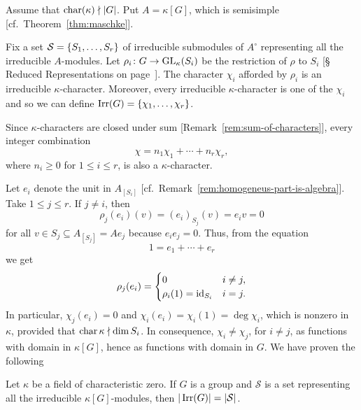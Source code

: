 \begin{rem}\label{rem:chi_j(e_i)}
    Assume that $\operatorname{char}(\kappa)\nmid|G|$. Put $A=\kappa[G]$, which is semisimple [cf.~Theorem~\ref{thm:maschke}]. 

    Fix a set $\mathcal S=\{S_1,\dots,S_r\}$ of irreducible submodules of $A^\circ$ representing all the irreducible $A$-modules. Let $\rho_i\colon G\to{\rm GL}_\kappa(S_i)$ be the restriction of $\rho$ to $S_i$ [\S\,Reduced Representations on page~\pageref{page:reudced-representations}]. The character $\chi_i$ afforded by $\rho_i$ is an irreducible $\kappa$-character. Moreover, every irreducible $\kappa$-character is one of the $\chi_i$ and so we can define $\operatorname{Irr}(G)=\{\chi_1,\dots,\chi_r\}$.
    
    Since $\kappa$-characters are closed under sum [Remark~\ref{rem:sum-of-characters}], every integer combination
    \begin{equation}\label{eq:integer-combination-of-characters}
        \chi = n_1\chi_1+\cdots+n_r\chi_r,
    \end{equation}
    where $n_i\ge0$ for $1\le i\le r$, is also a $\kappa$-character.
    
    Let $e_i$ denote the unit in $A_{[S_i]}$ [cf.~Remark~\ref{rem:homogeneus-part-is-algebra}]. Take $1\le j\le r$. If $j\ne i$, then
    \begin{equation}\label{eq:chi_j(e_i)}
        \rho_j(e_i)(v)=(e_i)_{S_j}(v)=e_iv=0
    \end{equation}
    for all $v\in S_j\subseteq A_{[S_j]}=Ae_j$ because $e_ie_j=0$. Thus, from the equation
    $$
        1 = e_1+\cdots+e_r
    $$
    we get
    $$
        \rho_j(e_i) = \begin{cases}
            0   &i\ne j,\\
            \rho_i(1)=\operatorname{id}_{S_i} &i=j.
        \end{cases}
    $$
    In particular, $\chi_j(e_i)=0$ and  $\chi_i(e_i)=\chi_i(1)=\deg\chi_i$, which is nonzero in~$\kappa$, provided that $\operatorname{char}\kappa\nmid\dim S_i$. In consequence, $\chi_i\ne\chi_j$, for $i\ne j$, as functions with domain in $\kappa[G]$, hence as functions with domain in $G$. We have proven the following
\end{rem}

\begin{prop}\label{prop:irreducible-characters-in-char-0}
    Let\/ $\kappa$ be a field of characteristic zero. If\/ $G$ is a group and\/ $\mathcal S$ is a set representing all the irreducible\/ $\kappa[G]$-modules, then\/ $|\operatorname{Irr}(G)|=|\mathcal S|$.
\end{prop}


